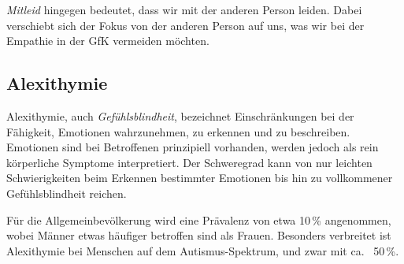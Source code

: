 \emph{Mitleid} hingegen bedeutet, dass wir mit der anderen Person leiden. Dabei verschiebt sich der Fokus von der anderen Person auf uns, was wir bei der Empathie in der GfK vermeiden möchten.


\subsection{Alexithymie}
\label{alexithymie}

Alexithymie, auch \emph{Gefühlsblindheit}, bezeichnet Einschränkungen bei der Fähigkeit, Emotionen wahrzunehmen, zu erkennen und zu beschreiben. Emotionen sind bei Betroffenen prinzipiell vorhanden, werden jedoch als rein körperliche Symptome interpretiert. Der Schweregrad kann von nur leichten Schwierigkeiten beim Erkennen bestimmter Emotionen bis hin zu vollkommener \glqq Gefühlsblindheit\grqq{} reichen.

Für die Allgemeinbevölkerung wird eine Prävalenz von etwa 10\,\% angenommen, wobei Männer etwas häufiger betroffen sind als Frauen. Besonders verbreitet ist Alexithymie bei Menschen auf dem Autismus-Spektrum, und zwar mit ca.~ 50\,\%.
